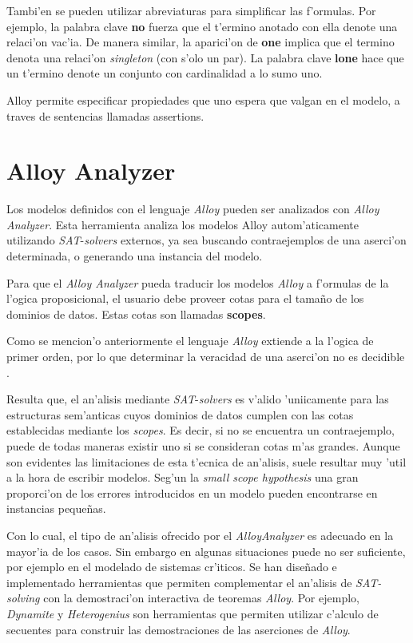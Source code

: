 Tambi'en se pueden utilizar abreviaturas para simplificar las f'ormulas. Por ejemplo, la palabra clave \textbf{no} fuerza que el t'ermino anotado con ella denote una relaci'on vac'ia. De manera similar, la aparici'on de \textbf{one} implica que el termino denota una relaci'on \textit{singleton} (con s'olo un par). La palabra clave \textbf{lone} hace que un t'ermino denote un conjunto con cardinalidad a lo sumo uno.

Alloy permite especificar propiedades que uno espera que valgan en el modelo, a traves de sentencias llamadas assertions.


\section{Alloy Analyzer}

Los modelos definidos con el lenguaje \textit{Alloy} pueden ser analizados con \textit{Alloy Analyzer}.
Esta herramienta analiza los modelos Alloy autom'aticamente utilizando \textit{SAT}-\textit{solvers} externos, ya sea buscando contraejemplos de una aserci'on determinada, o generando una instancia del modelo.

Para que el \textit{Alloy Analyzer} pueda traducir los modelos \textit{Alloy} a f'ormulas de la l'ogica proposicional, el usuario debe proveer cotas para el tamaño de los dominios de datos. Estas cotas son llamadas \textbf{scopes}.


Como se mencion'o anteriormente el lenguaje \textit{Alloy} extiende a la l'ogica de primer orden, por lo que determinar la veracidad de una aserci'on no es decidible \cite{meseguer:lc87,church}. 

Resulta que, el an'alisis mediante \textit{SAT}-\textit{solvers} es v'alido 'uniicamente para las estructuras sem'anticas cuyos dominios de datos cumplen con las cotas establecidas mediante los \textit{scopes}. Es decir, si no se encuentra un contraejemplo, puede de todas maneras existir uno si se consideran cotas m'as grandes. Aunque son evidentes las limitaciones de esta t'ecnica de an'alisis, suele resultar muy 'util a la hora de escribir modelos. Seg'un la \textit{small scope hypothesis} \cite{smallscope} una gran proporci'on de los errores introducidos en un modelo pueden encontrarse en instancias pequeñas.

Con lo cual, el tipo de an'alisis ofrecido por el \textit{AlloyAnalyzer} es adecuado en la mayor'ia de los casos. Sin embargo en algunas situaciones puede no ser suficiente, por ejemplo en el modelado de sistemas cr'iticos. Se han diseñado e implementado herramientas que permiten complementar el an'alisis de \textit{SAT-solving} con la demostraci'on interactiva de teoremas \textit{Alloy}. Por ejemplo, \textit{Dynamite} \cite{pdocfa} y \textit{Heterogenius} \cite{heterogenius} son herramientas que permiten utilizar c'alculo de secuentes para construir las demostraciones de las aserciones de \textit{Alloy}.

